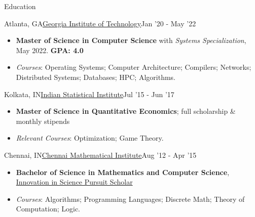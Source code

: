 \documentclass[]{mcdowellcv}
\begin{document}
  \begin{cvsection}{Education}
    \begin{cvsubsection}{Atlanta, GA}{\href{https://www.gatech.edu/}{Georgia Institute of Technology}}{Jan '20 - May '22}
      \begin{itemize}
        \item \textbf{Master of Science in Computer Science} with \textit{Systems Specialization}, May 2022. \textbf{GPA: 4.0}
        \item \textit{Courses}: Operating Systems; Computer Architecture; Compilers; Networks; Distributed Systems; Databases; HPC; Algorithms.
      \end{itemize}
    \end{cvsubsection}
    \begin{cvsubsection}{Kolkata, IN}{\href{https://www.isical.ac.in/}{Indian Statistical Institute}}{Jul '15 - Jun '17}
      \begin{itemize}
        \item \textbf{Master of Science in Quantitative Economics}; full scholarship \& monthly stipends
        \item \textit{Relevant Courses}: Optimization; Game Theory.
      \end{itemize}
    \end{cvsubsection}
    \begin{cvsubsection}{Chennai, IN}{\href{https://www.cmi.ac.in/}{Chennai Mathematical Institute}}{Aug '12 - Apr '15}
      \begin{itemize}
        \item \textbf{Bachelor of Science in Mathematics and Computer Science}, \href{https://www.online-inspire.gov.in/}{Innovation in Science Pursuit Scholar}
        \item \textit{Courses}: Algorithms; Programming Languages; Discrete Math; Theory of Computation; Logic.
      \end{itemize}
    \end{cvsubsection}
  \end{cvsection}
\end{document}
